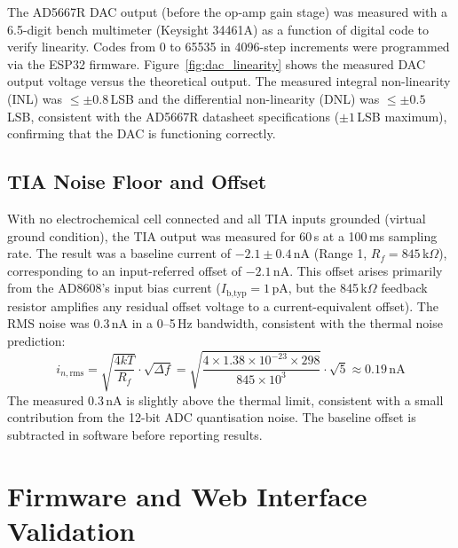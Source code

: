 The AD5667R DAC output (before the op-amp gain stage) was measured with a 6.5-digit bench multimeter (Keysight 34461A) as a function of digital code to verify linearity. Codes from 0 to 65535 in 4096-step increments were programmed via the ESP32 firmware. Figure~\ref{fig:dac_linearity} shows the measured DAC output voltage versus the theoretical output. The measured integral non-linearity (INL) was $\leq \pm 0.8$\,LSB and the differential non-linearity (DNL) was $\leq \pm 0.5$\,LSB, consistent with the AD5667R datasheet specifications ($\pm 1$\,LSB maximum), confirming that the DAC is functioning correctly.


\subsection{TIA Noise Floor and Offset}

With no electrochemical cell connected and all TIA inputs grounded (virtual ground condition), the TIA output was measured for 60\,s at a 100\,ms sampling rate. The result was a baseline current of $-2.1 \pm 0.4$\,nA (Range 1, $R_f = 845$\,k$\Omega$), corresponding to an input-referred offset of $-2.1$\,nA. This offset arises primarily from the AD8608's input bias current ($I_\text{b,typ} = 1$\,pA, but the 845\,k$\Omega$ feedback resistor amplifies any residual offset voltage to a current-equivalent offset). The RMS noise was 0.3\,nA in a 0--5\,Hz bandwidth, consistent with the thermal noise prediction:
\begin{equation}
    i_{n,\text{rms}} = \sqrt{\frac{4kT}{R_f}} \cdot \sqrt{\Delta f} = \sqrt{\frac{4 \times 1.38 \times 10^{-23} \times 298}{845 \times 10^3}} \cdot \sqrt{5} \approx 0.19\,\text{nA}
\end{equation}
The measured 0.3\,nA is slightly above the thermal limit, consistent with a small contribution from the 12-bit ADC quantisation noise. The baseline offset is subtracted in software before reporting results.

\section{Firmware and Web Interface Validation}
\label{sec:firmware_validation}

